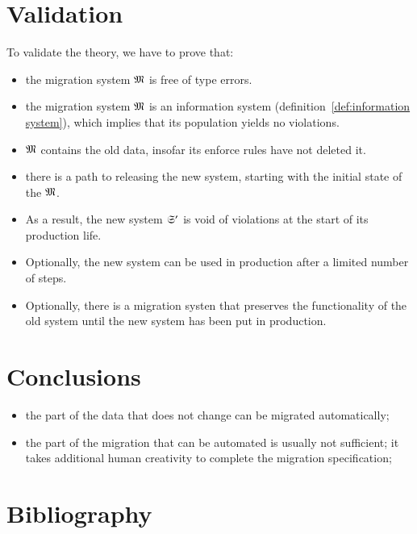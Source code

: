 \documentclass{elsarticle}
\begin{document}
\section{Validation}
   To validate the theory, we have to prove that:
\begin{itemize}
   \item the migration system $\mathfrak{M}$ is free of type errors.
   \item the migration system $\mathfrak{M}$ is an information system (definition~\ref{def:information system}),
         which implies that its population yields no violations.
   \item $\mathfrak{M}$ contains the old data, insofar its enforce rules have not deleted it.
   \item there is a path to releasing the new system, starting with the initial state of the $\mathfrak{M}$.
   \item As a result, the new system $\mathfrak{S}'$ is void of violations at the start of its production life.
   \item Optionally, the new system can be used in production after a limited number of steps.
   \item Optionally, there is a migration systen that preserves the functionality of the old system until the new system has been put in production.
\end{itemize}

\section{Conclusions}
\begin{itemize}
   \item the part of the data that does not change can be migrated automatically;
   \item the part of the migration that can be automated is usually not sufficient;
         it takes additional human creativity to complete the migration specification;
\end{itemize}
\section{Bibliography}


\end{document}
